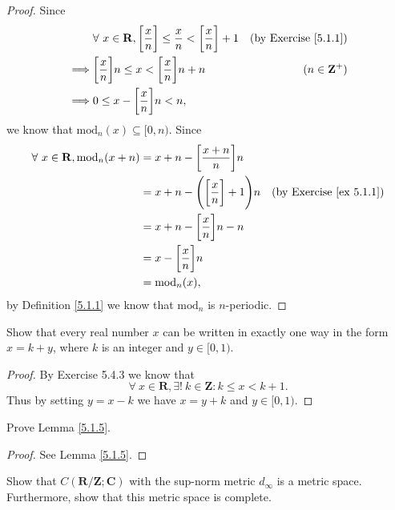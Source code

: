 \begin{proof}
    Since
    \begin{align*}
                 & \forall\ x \in \mathbf{R}, \bigg[\frac{x}{n}\bigg] \leq \frac{x}{n} < \bigg[\frac{x}{n}\bigg] + 1 & \text{(by Exercise \ref{5.1.1})} \\
        \implies & \bigg[\frac{x}{n}\bigg] n \leq x < \bigg[\frac{x}{n}\bigg] n + n                                  & (n \in \mathbf{Z}^+)             \\
        \implies & 0 \leq x - \bigg[\frac{x}{n}\bigg] n < n,
    \end{align*}
    we know that \(\text{mod}_n(x) \subseteq [0, n)\).
    Since
    \begin{align*}
        \forall\ x \in \mathbf{R}, \text{mod}_n(x + n) & = x + n - \bigg[\frac{x + n}{n}\bigg] n                                                   \\
                                                       & = x + n - \Bigg(\bigg[\frac{x}{n}\bigg] + 1\Bigg) n & \text{(by Exercise \ref{ex 5.1.1})} \\
                                                       & = x + n - \bigg[\frac{x}{n}\bigg] n - n                                                   \\
                                                       & = x - \bigg[\frac{x}{n}\bigg] n                                                           \\
                                                       & = \text{mod}_n(x),
    \end{align*}
    by Definition \ref{5.1.1} we know that \(\text{mod}_n\) is \(n\)-periodic.
\end{proof}

\exercisesection

\begin{exercise}\label{ex 5.1.1}
    Show that every real number \(x\) can be written in exactly one way in the form \(x = k + y\), where \(k\) is an integer and \(y \in [0, 1)\).
\end{exercise}

\begin{proof}
    By Exercise 5.4.3 we know that
    \[
        \forall\ x \in \mathbf{R}, \exists!\ k \in \mathbf{Z} : k \leq x < k + 1.
    \]
    Thus by setting \(y = x - k\) we have \(x = y + k\) and \(y \in [0, 1)\).
\end{proof}

\begin{exercise}\label{ex 5.1.2}
    Prove Lemma \ref{5.1.5}.
\end{exercise}

\begin{proof}
    See Lemma \ref{5.1.5}.
\end{proof}

\begin{exercise}\label{ex 5.1.3}
    Show that \(C(\mathbf{R} / \mathbf{Z} ; \mathbf{C})\) with the sup-norm metric \(d_\infty\) is a metric space.
    Furthermore, show that this metric space is complete.
\end{exercise}